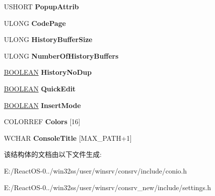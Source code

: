 \begin{DoxyCompactItemize}
\item 
\mbox{\label{struct___c_o_n_s_o_l_e___i_n_f_o_ad49670aa29ec541460821ffbbd3423eb}} 
U\+S\+H\+O\+RT {\bfseries Popup\+Attrib}
\item 
\mbox{\label{struct___c_o_n_s_o_l_e___i_n_f_o_a998bfdf7f3f93cc85f8d1f80ac227c35}} 
U\+L\+O\+NG {\bfseries Code\+Page}
\item 
\mbox{\label{struct___c_o_n_s_o_l_e___i_n_f_o_ac38a7122a9dc14a644539cd29d5a3a76}} 
U\+L\+O\+NG {\bfseries History\+Buffer\+Size}
\item 
\mbox{\label{struct___c_o_n_s_o_l_e___i_n_f_o_a56f5a10f24a3713805e00a6a5cd944f6}} 
U\+L\+O\+NG {\bfseries Number\+Of\+History\+Buffers}
\item 
\mbox{\label{struct___c_o_n_s_o_l_e___i_n_f_o_a18cfb6fa3a9bd9ba497db44b12755596}} 
\hyperlink{_processor_bind_8h_a112e3146cb38b6ee95e64d85842e380a}{B\+O\+O\+L\+E\+AN} {\bfseries History\+No\+Dup}
\item 
\mbox{\label{struct___c_o_n_s_o_l_e___i_n_f_o_a0f1ad93a989d71faee50bc721d4c552d}} 
\hyperlink{_processor_bind_8h_a112e3146cb38b6ee95e64d85842e380a}{B\+O\+O\+L\+E\+AN} {\bfseries Quick\+Edit}
\item 
\mbox{\label{struct___c_o_n_s_o_l_e___i_n_f_o_ab7c4a796b1c8cecb93b4e571f1ab0250}} 
\hyperlink{_processor_bind_8h_a112e3146cb38b6ee95e64d85842e380a}{B\+O\+O\+L\+E\+AN} {\bfseries Insert\+Mode}
\item 
\mbox{\label{struct___c_o_n_s_o_l_e___i_n_f_o_a1e70e53c6815d5513ac7309e8be0116f}} 
C\+O\+L\+O\+R\+R\+EF {\bfseries Colors} \mbox{[}16\mbox{]}
\item 
\mbox{\label{struct___c_o_n_s_o_l_e___i_n_f_o_ae31d5c2b822dc0d706e836803a2b7123}} 
W\+C\+H\+AR {\bfseries Console\+Title} \mbox{[}M\+A\+X\+\_\+\+P\+A\+TH+1\mbox{]}
\end{DoxyCompactItemize}


该结构体的文档由以下文件生成\+:\begin{DoxyCompactItemize}
\item 
E\+:/\+React\+O\+S-\/0../win32ss/user/winsrv/consrv/include/conio.\+h\item 
E\+:/\+React\+O\+S-\/0../win32ss/user/winsrv/consrv\+\_\+new/include/settings.\+h\end{DoxyCompactItemize}
